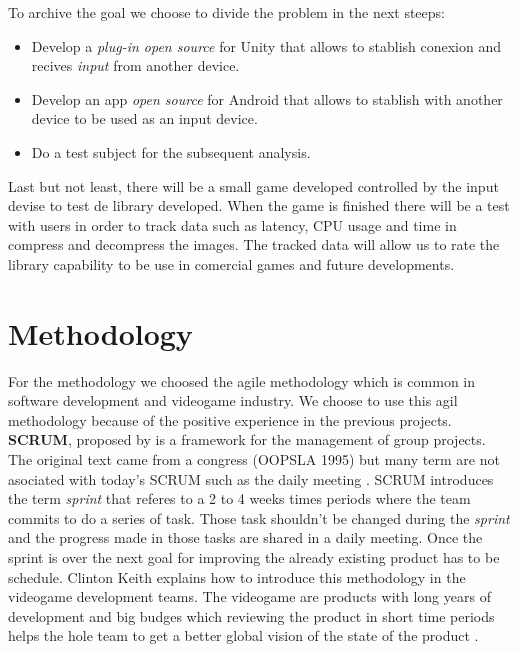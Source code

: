 To archive the goal we choose to divide the problem in the next steeps:

\begin {itemize}
\item Develop a \textit{plug-in open source} for Unity that allows to stablish conexion and recives \textit{input} from another device.
\item Develop an app \textit{open source} for Android that allows to stablish with another device to be used as an input device.
\item Do a test subject for the subsequent analysis.
\end {itemize}

Last but not least, there will be a small game developed controlled by the input devise to test de library developed. When the game is finished there will be a test with users in order to track data such as latency, CPU usage and time in compress and decompress the images. The tracked data will allow us to rate the library capability to be use in comercial games and future developments.\\

\section*{Methodology}

For the methodology we choosed the agile methodology which is common in software development and videogame industry. We choose to use this agil methodology because of the positive experience in the previous projects.\\

\textbf{SCRUM}, proposed by \cite{scrum} is a framework for the management of group projects. The original text came from a congress (OOPSLA 1995) but many term are not asociated with today's SCRUM such as the daily meeting \citep{scrum2}. SCRUM introduces the term \textit{sprint} that referes to a 2 to 4 weeks times periods where the team commits to do a series of task. Those task shouldn't be changed during the \textit{sprint} and the progress made in those tasks are shared in a daily meeting. Once the sprint is over the next goal for improving the already existing product has to be schedule. Clinton Keith explains how to introduce this methodology in the videogame development teams. The videogame are products with long years of development and big budges which reviewing the product in short time periods helps the hole team to get a better global vision of the state of the product \citep{keith2010agile}.\\

